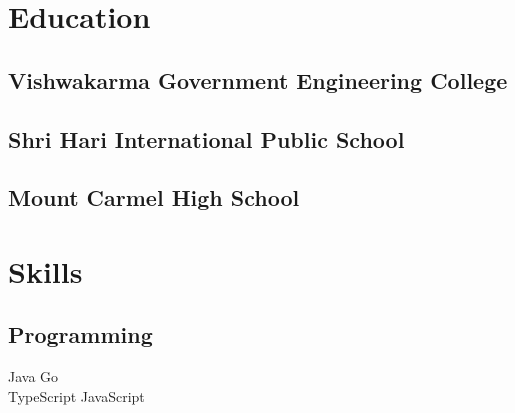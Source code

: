 \documentclass[]{deedy-resume-reversed}
\begin{document}
\begin{minipage}[t]{0.33\textwidth}


\section{Education}

\subsection{Vishwakarma Government Engineering College}
\sectionsep

\subsection{Shri Hari International Public School}
\sectionsep

\subsection{Mount Carmel High School}
\sectionsep


\section{Skills}
\subsection{Programming}
Java \textbullet{} Go \\
TypeScript \textbullet{} JavaScript \\
\sectionsep


\end{minipage}
\end{document}
